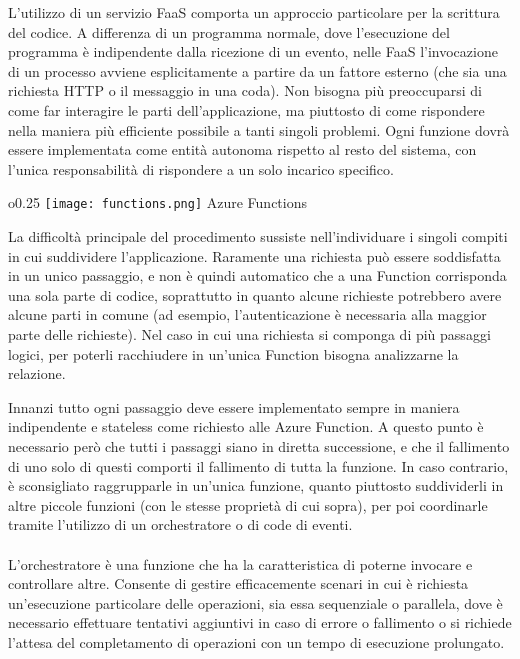 L'utilizzo di un servizio FaaS
comporta un approccio particolare per la scrittura del codice.
A differenza di un programma normale,
dove l'esecuzione del programma è indipendente dalla ricezione di un evento,
nelle FaaS l'invocazione di un processo avviene esplicitamente a partire da un fattore esterno
(che sia una richiesta HTTP o il messaggio in una coda).
Non bisogna più preoccuparsi di come far interagire le parti dell'applicazione,
ma piuttosto di come rispondere nella maniera più efficiente possibile a tanti singoli problemi.
Ogni funzione dovrà essere implementata come entità autonoma rispetto al resto del sistema,
con l'unica responsabilità di rispondere a un solo incarico specifico.\\
\begin{wrapfigure}{o}{0.25\textwidth}
    \centering
    \texttt{[image: functions.png]}
    Azure Functions
\end{wrapfigure}
La difficoltà principale del procedimento sussiste nell'individuare i singoli compiti
in cui suddividere l'applicazione.
Raramente una richiesta può essere soddisfatta in un unico passaggio,
e non è quindi automatico che a una Function corrisponda una sola parte di codice,
soprattutto in quanto alcune richieste potrebbero avere alcune parti in comune
(ad esempio, l'autenticazione è necessaria alla maggior parte delle richieste).
Nel caso in cui una richiesta si componga di più passaggi logici,
per poterli racchiudere in un'unica Function bisogna analizzarne la relazione.\\
\par
Innanzi tutto ogni passaggio deve essere implementato
sempre in maniera indipendente e stateless come richiesto alle Azure Function.
A questo punto è necessario però che tutti i passaggi siano in diretta successione,
e che il fallimento di uno solo di questi comporti il fallimento di tutta la funzione.
In caso contrario, è sconsigliato raggrupparle in un'unica funzione,
quanto piuttosto suddividerli in altre piccole funzioni
(con le stesse proprietà di cui sopra),
per poi coordinarle tramite l'utilizzo di un orchestratore o di code di eventi.\\
\\
L'orchestratore è una funzione che ha la caratteristica
di poterne invocare e controllare altre.
Consente di gestire efficacemente scenari
in cui è richiesta un'esecuzione particolare delle operazioni, sia essa sequenziale o parallela,
dove è necessario effettuare tentativi aggiuntivi in caso di errore o fallimento o
si richiede l'attesa del completamento di operazioni con un tempo di esecuzione prolungato.
